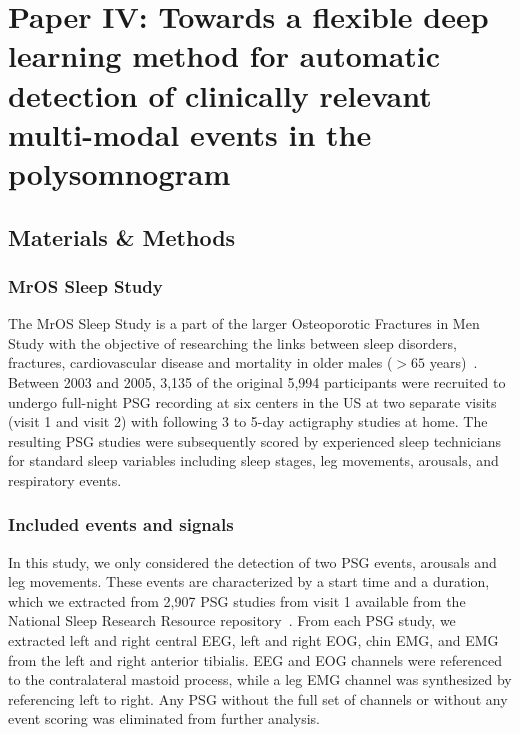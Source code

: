 \section{Paper IV: Towards a flexible deep learning method for automatic detection of clinically relevant multi-modal events in the polysomnogram}\label{sec:paperiv}

\subsection{Materials \& Methods}

\subsubsection{MrOS Sleep Study}
The MrOS Sleep Study is a part of the larger Osteoporotic Fractures in Men Study with the objective of researching the links between sleep disorders, fractures, cardiovascular disease and mortality in older males ($>65$ years)~\cite{Blank2005,Orwoll2005,Blackwell2011}. Between 2003 and 2005, 3,135 of the original 5,994 participants were recruited to undergo full-night \ac{PSG} recording at six centers in the US at two separate visits (visit 1 and visit 2) with following 3 to 5-day actigraphy studies at home. The resulting \ac{PSG} studies were subsequently scored by experienced sleep technicians for standard sleep variables including sleep stages, leg movements, arousals, and respiratory events.

\subsubsection{Included events and signals}
In this study, we only considered the detection of two \ac{PSG} events, arousals and leg movements. These events are characterized by a start time and a duration, which we extracted from 2,907 \ac{PSG} studies from visit 1 available from the National Sleep Research Resource repository~\cite{Dean2016,Zhang2018}. From each \ac{PSG} study, we extracted left and right central \ac{EEG}, left and right \ac{EOG}, chin \ac{EMG}, and \ac{EMG} from the left and right anterior tibialis. \Ac{EEG} and \ac{EOG} channels were referenced to the contralateral mastoid process, while a leg \ac{EMG} channel was synthesized by referencing left to right. Any \ac{PSG} without the full set of channels or without any event scoring was eliminated from further analysis.

